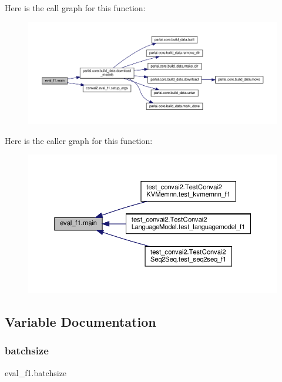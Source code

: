 Here is the call graph for this function\+:
\nopagebreak
\begin{figure}[H]
\begin{center}
\leavevmode
\includegraphics[width=350pt]{namespaceeval__f1_a4e679ae3282c9831e50ff8ed0a325a0e_cgraph}
\end{center}
\end{figure}
Here is the caller graph for this function\+:
\nopagebreak
\begin{figure}[H]
\begin{center}
\leavevmode
\includegraphics[width=350pt]{namespaceeval__f1_a4e679ae3282c9831e50ff8ed0a325a0e_icgraph}
\end{center}
\end{figure}


\subsection{Variable Documentation}
\mbox{\label{namespaceeval__f1_aad0fe588709e8822a0cb7f0047a228f9}} 
\subsubsection{\texorpdfstring{batchsize}{batchsize}}
{\footnotesize\ttfamily eval\+\_\+f1.\+batchsize}



